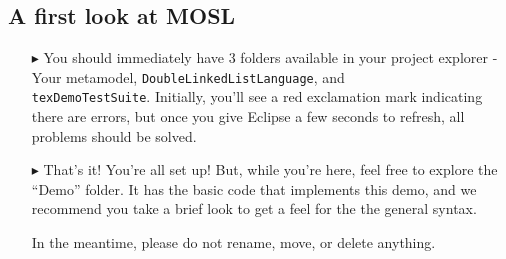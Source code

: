\newpage
\texHeader

\subsection{A first look at MOSL}

\begin{itemize}
\FloatBarrier
\item[$\blacktriangleright$] You\hypertarget{simpleDemo tex}{} should immediately have 3 folders available in your project explorer - Your metamodel,
\texttt{DoubleLinkedListLanguage}, and \\ \texttt{texDemoTestSuite}. Initially, you'll see a red exclamation mark indicating there are errors, but once you give
Eclipse a few seconds to refresh, all problems should be solved.

\item[$\blacktriangleright$] That's it! You're all set up! But, while you're here, feel free to explore the ``Demo'' folder. It has the basic code that implements
this demo, and we recommend you take a brief look to get a feel for the the general syntax.

In the meantime, please do not rename, move, or delete anything.
\end{itemize}